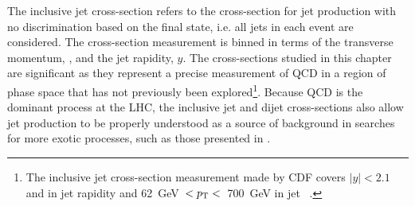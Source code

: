 %
The inclusive jet cross-section refers to the cross-section for jet production with no discrimination based on the final state, i.e. all jets in each event are considered. The cross-section measurement is binned in terms of the transverse momentum, \pt, and the jet rapidity, $y$. The cross-sections studied in this chapter are significant as they represent a precise measurement of QCD in a region of phase space that has not previously been explored\footnote{The inclusive jet cross-section measurement made by CDF covers $|y| < 2.1$ and in jet rapidity and 62~GeV~$ < p_{\mathrm{T}} < $~700~GeV in jet \pt~\cite{CDF_incjets}.}. Because QCD is the dominant process at the LHC, the inclusive jet and dijet cross-sections also allow jet production to be properly understood as a source of background in searches for more exotic processes, such as those presented in \cite{monojets,dijets}.

